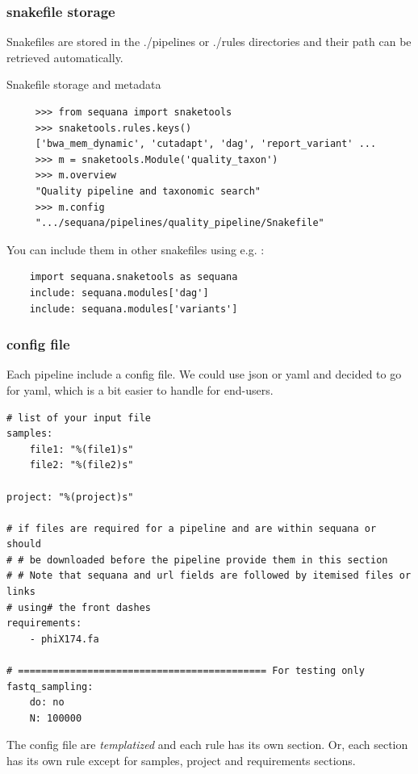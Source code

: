 \documentclass{beamer}
\begin{document}
\begin{frame}[fragile]
    \frametitle{snakefile storage}
    Snakefiles are stored in the ./pipelines or ./rules directories and their path
    can be retrieved automatically.
    \tiny
    \begin{block}{Snakefile storage and metadata}
    \begin{lstlisting}
     >>> from sequana import snaketools 
     >>> snaketools.rules.keys()
     ['bwa_mem_dynamic', 'cutadapt', 'dag', 'report_variant' ...
     >>> m = snaketools.Module('quality_taxon')
     >>> m.overview
     "Quality pipeline and taxonomic search"
     >>> m.config
     ".../sequana/pipelines/quality_pipeline/Snakefile"
    \end{lstlisting}

    You can include them in other snakefiles using e.g. :
    \begin{lstlisting}
    import sequana.snaketools as sequana
    include: sequana.modules['dag']
    include: sequana.modules['variants']
    \end{lstlisting}

    \end{block}
\end{frame}


\begin{frame}[fragile]
 \frametitle{config file}
 Each pipeline include a config file. We could use json or yaml and decided 
 to go for yaml, which is a bit easier to handle for end-users.
 
\begin{block}{}
 \begin{lstlisting} 
# list of your input file
samples:
    file1: "%(file1)s"
    file2: "%(file2)s"

project: "%(project)s"

# if files are required for a pipeline and are within sequana or should
# # be downloaded before the pipeline provide them in this section
# # Note that sequana and url fields are followed by itemised files or links
# using# the front dashes
requirements:
    - phiX174.fa

# =========================================== For testing only
fastq_sampling:
    do: no
    N: 100000
\end{lstlisting}
\end{block}
 
 \small

The config file are \textit{templatized} and each rule has its own section.
Or, each section has its own rule except for samples, project and requirements 
sections.
\end{frame}
\end{document}
